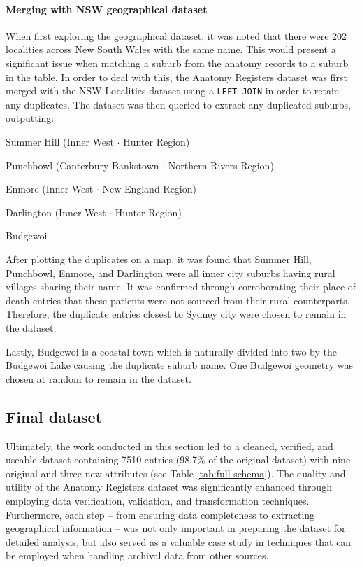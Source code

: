\paragraph{Merging with NSW geographical dataset}{When first exploring the geographical dataset, it was noted that there were 202 localities across New South Wales with the same name. This would present a significant issue when matching a suburb from the anatomy records to a suburb in the table. In order to deal with this, the Anatomy Registers dataset was first merged with the NSW Localities dataset using a \texttt{LEFT JOIN} in order to retain any duplicates. The dataset was then queried to extract any duplicated suburbs, outputting:
\begin{APAenumerate}
    \item Summer Hill (Inner West $\cdot$ Hunter Region)
    \item Punchbowl (Canterbury-Bankstown $\cdot$ Northern Rivers Region)
    \item Enmore (Inner West $\cdot$ New England Region)
    \item Darlington (Inner West $\cdot$ Hunter Region)
    \item Budgewoi
\end{APAenumerate}

After plotting the duplicates on a map, it was found that Summer Hill, Punchbowl, Enmore, and Darlington were all inner city suburbs having rural villages sharing their name. It was confirmed through corroborating their place of death entries that these patients were not sourced from their rural counterparts. Therefore, the duplicate entries closest to Sydney city were chosen to remain in the dataset.

Lastly, Budgewoi is a coastal town which is naturally divided into two by the Budgewoi Lake causing the duplicate suburb name. One Budgewoi geometry was chosen at random to remain in the dataset.
}

\subsection{Final dataset}

Ultimately, the work conducted in this section led to a cleaned, verified, and useable dataset containing 7510 entries (98.7\% of the original dataset) with nine original and three new attributes (see Table \ref{tab:full-schema}). The quality and utility of the Anatomy Registers dataset was significantly enhanced through employing data verification, validation, and transformation techniques. Furthermore, each step -- from ensuring data completeness to extracting geographical information -- was not only important in preparing the dataset for detailed analysis, but also served as a valuable case study in techniques that can be employed when handling archival data from other sources. 

